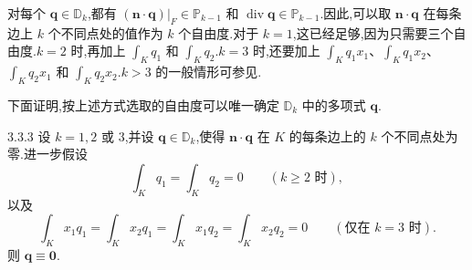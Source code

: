 对每个 \(\boldsymbol{q}\in\mathbb D_k\),都有 \((\boldsymbol{n}\cdot\boldsymbol{q})|_F\in\mathbb P_{k-1}\) 和 \(\operatorname{div}\boldsymbol{q}\in\mathbb P_{k-1}\).因此,可以取 \(\boldsymbol{n}\cdot\boldsymbol{q}\) 在每条边上 \(k\) 个不同点处的值作为 \(k\) 个自由度.对于 \(k=1\),这已经足够,因为只需要三个自由度.\(k=2\) 时,再加上 \(\int_K q_1\) 和 \(\int_K q_2\).\(k=3\) 时,还要加上 \(\int_K q_1x_1\)、\(\int_K q_1x_2\)、\(\int_K q_2x_1\) 和 \(\int_K q_2x_2\).\(k>3\) 的一般情形可参见.

下面证明,按上述方式选取的自由度可以唯一确定 \(\mathbb D_k\) 中的多项式 \(\boldsymbol{q}\).

\begin{proposition}[]{3.3.3}
设 \(k=1,2\) 或 \(3\),并设 \(\boldsymbol{q}\in\mathbb D_k\),使得 \(\boldsymbol{n}\cdot\boldsymbol{q}\) 在 \(K\) 的每条边上的 \(k\) 个不同点处为零.进一步假设
\begin{equation}\label{eq:3.3.2}
  \int_K q_1=\int_K q_2=0\qquad (k\ge2\text{ 时}),
\end{equation}
以及
\begin{equation}\label{eq:3.3.3}
  \int_K x_1q_1=\int_K x_2q_1=\int_K x_1q_2=\int_K x_2q_2=0
  \qquad (\text{仅在 }k=3\text{ 时}).
\end{equation}
则 \(\boldsymbol{q}\equiv\boldsymbol{0}\).
\end{proposition}

